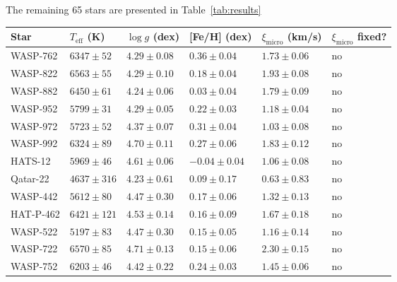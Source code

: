 \documentclass{aa}
\begin{document}
The remaining 65 stars are presented in Table~\ref{tab:results}


\begin{table*}[htb!]
    \caption{The derived parameters for the 65 stars in our sample.}
    \label{tab:results}
    \centering
    \begin{tabular}{llllll}
      \hline\hline
        Star      & $T_\mathrm{eff}$ (K) &  $\log g$ (dex)     &  [Fe/H] (dex)        &  $\xi_\mathrm{micro}$ (km/s) & $\xi_\mathrm{micro}$ fixed? \\
      \hline
      WASP-762    &    $6347 \pm 52 $    &  $4.29 \pm 0.08$    &  $ 0.36 \pm 0.04$    &  $1.73 \pm 0.06$             &   no  \\
      WASP-822    &    $6563 \pm 55 $    &  $4.29 \pm 0.10$    &  $ 0.18 \pm 0.04$    &  $1.93 \pm 0.08$             &   no  \\
      WASP-882    &    $6450 \pm 61 $    &  $4.24 \pm 0.06$    &  $ 0.03 \pm 0.04$    &  $1.79 \pm 0.09$             &   no  \\
      WASP-952    &    $5799 \pm 31 $    &  $4.29 \pm 0.05$    &  $ 0.22 \pm 0.03$    &  $1.18 \pm 0.04$             &   no  \\
      WASP-972    &    $5723 \pm 52 $    &  $4.37 \pm 0.07$    &  $ 0.31 \pm 0.04$    &  $1.03 \pm 0.08$             &   no  \\
      WASP-992    &    $6324 \pm 89 $    &  $4.70 \pm 0.11$    &  $ 0.27 \pm 0.06$    &  $1.83 \pm 0.12$             &   no  \\
      HATS-12     &    $5969 \pm 46 $    &  $4.61 \pm 0.06$    &  $-0.04 \pm 0.04$    &  $1.06 \pm 0.08$             &   no  \\
      Qatar-22    &    $4637 \pm 316$    &  $4.23 \pm 0.61$    &  $ 0.09 \pm 0.17$    &  $0.63 \pm 0.83$             &   no  \\
      WASP-442    &    $5612 \pm 80 $    &  $4.47 \pm 0.30$    &  $ 0.17 \pm 0.06$    &  $1.32 \pm 0.13$             &   no  \\
      HAT-P-462   &    $6421 \pm 121$    &  $4.53 \pm 0.14$    &  $ 0.16 \pm 0.09$    &  $1.67 \pm 0.18$             &   no  \\
      WASP-522    &    $5197 \pm 83 $    &  $4.47 \pm 0.30$    &  $ 0.15 \pm 0.05$    &  $1.16 \pm 0.14$             &   no  \\
      WASP-722    &    $6570 \pm 85 $    &  $4.71 \pm 0.13$    &  $ 0.15 \pm 0.06$    &  $2.30 \pm 0.15$             &   no  \\
      WASP-752    &    $6203 \pm 46 $    &  $4.42 \pm 0.22$    &  $ 0.24 \pm 0.03$    &  $1.45 \pm 0.06$             &   no  \\

\end{tabular}
\end{table*}
\end{document}
